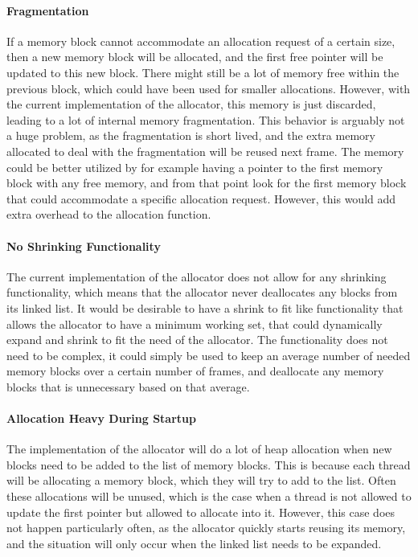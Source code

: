 \paragraph{Fragmentation}
If a memory block cannot accommodate an allocation request of a certain size, then a new memory block will be allocated, and the first free pointer will be updated to this new block.
There might still be a lot of memory free within the previous block, which could have been used for smaller allocations.
However, with the current implementation of the allocator, this memory is just discarded, leading to a lot of internal memory fragmentation.
This behavior is arguably not a huge problem, as the fragmentation is short lived, and the extra memory allocated to deal with the fragmentation
will be reused next frame.
The memory could be better utilized by for example having a pointer to the first memory block with any free memory, and from that point look for the first memory block that could accommodate a specific allocation request. However, this would add extra overhead to the allocation function.

\paragraph{No Shrinking Functionality}
The current implementation of the allocator does not allow for any shrinking functionality, which means that the allocator never deallocates any blocks from its linked list.
It would be desirable to have a shrink to fit like functionality that allows the allocator to have a minimum working set, that could dynamically expand and shrink to fit the need of the allocator.
The functionality does not need to be complex, it could simply be used to keep an average number of needed memory blocks over a certain number of frames, and deallocate any memory blocks that is unnecessary based on that average.

\paragraph{Allocation Heavy During Startup}
The implementation of the allocator will do a lot of heap allocation when new blocks need to be added to the list of memory blocks.
This is because each thread will be allocating a memory block, which they will try to add to the list.
Often these allocations will be unused, which is the case when a thread is not allowed to update the first pointer but allowed to allocate into it.
However, this case does not happen particularly often, as the allocator quickly starts reusing its memory, and the situation will only occur when
the linked list needs to be expanded.

